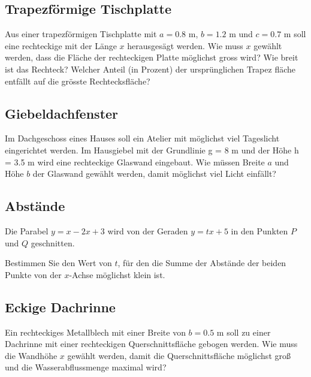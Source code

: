 \subsection{Trapezförmige Tischplatte}
Aus einer trapezförmigen Tischplatte mit
$a = 0.8 \text{ m}$, $b = 1.2 \text{ m}$ und $c = 0.7 \text{ m}$ soll eine
rechteckige mit der Länge $x$ herausgesägt
werden. Wie muss $x$ gewählt werden, dass
die Fläche der rechteckigen Platte möglichst
gross wird? Wie breit ist das Rechteck? Welcher
Anteil (in Prozent) der ursprünglichen Trapez­
fläche entfällt auf die grösste Rechtecksfläche?



\subsection{Giebeldachfenster}

Im Dachgeschoss eines Hauses soll ein Atelier
mit möglichst viel Tageslicht eingerichtet
werden. Im Hausgiebel mit der Grundlinie
g = 8 m und der Höhe h = 3.5 m wird eine
rechteckige Glaswand eingebaut. Wie müssen
Breite $a$ und Höhe $b$ der Glaswand gewählt
werden, damit möglichst viel Licht einfällt?




\subsection{Abstände}
Die Parabel $y = x - 2x + 3$ wird von der Geraden $y = tx + 5$ in den
Punkten $P$ und $Q$ geschnitten.

Bestimmen Sie den Wert von $t$, für den die Summe der Abstände der beiden Punkte
von der $x$-Achse möglichst klein ist.



\subsection{Eckige Dachrinne}
Ein rechteckiges Metallblech mit einer Breite
von $b = 0.5 \text{ m}$ soll zu einer Dachrinne mit einer
rechteckigen Querschnittsfläche gebogen werden.
Wie muss die Wandhöhe $x$ gewählt werden, damit
die Querschnittsfläche möglichst groß und die
Wasserabflussmenge maximal wird?

